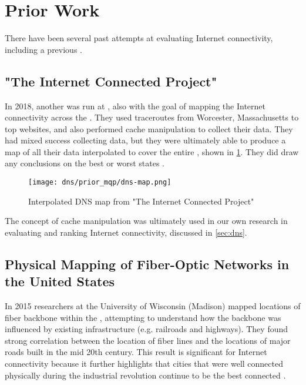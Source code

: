 \section{Prior Work}\label{sec:background_prior_work}

There have been several past attempts at evaluating \us Internet connectivity, including a previous \wpi \mqp.

 
\subsection{"The Internet Connected Project"}
In 2018, another \mqp was run at \wpi, also with the goal of mapping the Internet connectivity across the \us. They used traceroutes from Worcester, Massachusetts to top websites, and also performed \dns cache manipulation to collect their data. They had mixed success collecting data, but they were ultimately able to produce a map of all their \dns data interpolated to cover the entire \us, shown in \cref{fig:interpolated_dns_map}. They did draw any conclusions on the best or worst states \cite{Fakult2019}.

\begin{figure}[h]
    \centering
    \texttt{[image: dns/prior\_mqp/dns-map.png]}
    \caption{Interpolated DNS map from "The Internet Connected Project"\cite{Fakult2019}}
    \label{fig:interpolated_dns_map}
\end{figure}

The concept of \dns cache manipulation was ultimately used in our own research in evaluating and ranking Internet connectivity, discussed in \cref{sec:dns}.

\subsection{Physical Mapping of Fiber-Optic Networks in the United States}
In 2015 researchers at the University of Wisconsin (Madison) mapped locations of fiber backbone within the \us, attempting to understand how the backbone was influenced by existing infrastructure (e.g. railroads and highways). They found strong correlation between the location of fiber lines and the locations of major roads built in the mid 20th century. This result is significant for Internet connectivity because it further highlights that cities that were well connected physically during the industrial revolution continue to be the best connected \cite{Durairajan2015a}.
 